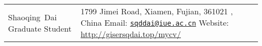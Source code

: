 \documentclass[11pt, a4paper]{article}
\makeatletter
\newcommand{\FirstName}{Shaoqing}
\newcommand{\LastName}{Dai}
\newcommand{\MyName}{\FirstName\ \LastName}
\newcommand{\MyRole}{Graduate Student}
\newcommand{\Email}{sqddai@iue.ac.cn}
\newcommand{\Website}{http://gisersqdai.top/mycv/}
\newcommand{\Affiliation}{
    Institute of Urban Environment,
    Chinese Academy of Sciences
}
\newcommand{\Address}{
    1799 Jimei Road, Xiamen, Fujian, 361021 , China
}
\newcommand{\makefield}[2]{\makebox[1.5em]{\color{MarkerColour!80!black}#1} #2}
\makeatother
\begin{document}
\thispagestyle{empty}

\begin{tabular}{p{} p{}}
    {\fontsize{25pt}{0}\selectfont \MyName} \newline
    \newline
    {\fontsize{12pt}{0}\selectfont \MyRole} \newline
    &
    {\fontsize{10pt}{0}\selectfont 
    \Address \newline
    Email: \href{mailto:\Email}{\texttt{\Email}}\newline
    Website: \url{\Website}
    }
\end{tabular}


%
%

%









%
%
\end{document}
